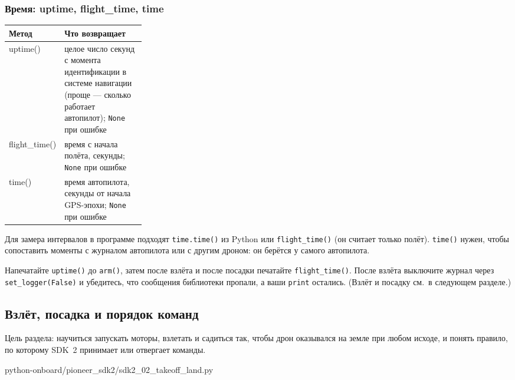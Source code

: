 \subsubsection*{Время: uptime, flight\_time, time}

\begin{center}
\small
\begin{tabularx}{\linewidth}{@{}>{\ttfamily\raggedright\arraybackslash}p{0.27\linewidth} X@{}}
\toprule
\textrm{\textbf{Метод}} & \textbf{Что возвращает} \\
\midrule
uptime() & целое число секунд с момента идентификации в системе навигации (проще --- сколько работает автопилот); \verb|None| при ошибке \\
flight\_time() & время с начала полёта, секунды; \verb|None| при ошибке \\
time() & время автопилота, секунды от начала GPS-эпохи; \verb|None| при ошибке \\
\bottomrule
\end{tabularx}
\end{center}

Для замера интервалов в программе подходят \verb|time.time()| из Python или \verb|flight_time()| (он считает только полёт). \verb|time()| нужен, чтобы сопоставить моменты с журналом автопилота или с другим дроном: он берётся у самого автопилота.

\begin{taskbox}
Напечатайте \verb|uptime()| до \verb|arm()|, затем после взлёта и после посадки печатайте \verb|flight_time()|. После взлёта выключите журнал через \verb|set_logger(False)| и убедитесь, что сообщения библиотеки пропали, а ваши \verb|print| остались. (Взлёт и посадку см.\ в следующем разделе.)
\end{taskbox}

\subsection{Взлёт, посадка и порядок команд}

Цель раздела: научиться запускать моторы, взлетать и садиться так, чтобы дрон оказывался на земле при любом исходе, и понять правило, по которому SDK~2 принимает или отвергает команды.

\begin{codefile}[python]{python-onboard/pioneer_sdk2/sdk2_02_takeoff_land.py}
\end{codefile}

